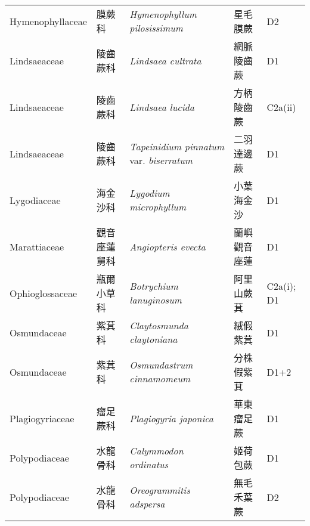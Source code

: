 {\begin{longtable}{p{2.5cm}p{2.5cm}p{4.5cm}p{2.5cm}p{3cm}}
    Hymenophyllaceae & 膜蕨科 & \textit{Hymenophyllum pilosissimum}  & 星毛膜蕨 & D2 \index{Hymenophyllum@\textit{Hymenophyllum}!pilosissimum@\textit{pilosissimum}}  \index{星毛膜蕨} \\
    Lindsaeaceae & 陵齒蕨科 & \textit{Lindsaea cultrata}  & 網脈陵齒蕨 & D1 \index{Lindsaea@\textit{Lindsaea}!cultrata@\textit{cultrata}}  \index{網脈陵齒蕨} \\
    Lindsaeaceae & 陵齒蕨科 & \textit{Lindsaea lucida}  & 方柄陵齒蕨 & C2a(ii) \index{Lindsaea@\textit{Lindsaea}!lucida@\textit{lucida}}  \index{方柄陵齒蕨} \\
    Lindsaeaceae & 陵齒蕨科 & \textit{Tapeinidium pinnatum} var. \textit{biserratum}  & 二羽達邊蕨 & D1 \index{Tapeinidium@\textit{Tapeinidium}!pinnatum@\textit{pinnatum}!var. biserratum@var. \textit{biserratum}}  \index{二羽達邊蕨} \\
    Lygodiaceae & 海金沙科 & \textit{Lygodium microphyllum}  & 小葉海金沙 & D1 \index{Lygodium@\textit{Lygodium}!microphyllum@\textit{microphyllum}}  \index{小葉海金沙} \\
    Marattiaceae & 觀音座蓮舅科 & \textit{Angiopteris evecta}  & 蘭嶼觀音座蓮 & D1 \index{Angiopteris@\textit{Angiopteris}!evecta@\textit{evecta}}  \index{蘭嶼觀音座蓮} \\
    Ophioglossaceae & 瓶爾小草科 & \textit{Botrychium lanuginosum}  & 阿里山蕨萁 & C2a(i); D1 \index{Botrychium@\textit{Botrychium}!lanuginosum@\textit{lanuginosum}}  \index{阿里山蕨萁} \\
    Osmundaceae & 紫萁科 & \textit{Claytosmunda claytoniana}  & 絨假紫萁 & D1 \index{Claytosmunda@\textit{Claytosmunda}!claytoniana@\textit{claytoniana}}  \index{絨假紫萁} \\
    Osmundaceae & 紫萁科 & \textit{Osmundastrum cinnamomeum}  & 分株假紫萁 & D1+2 \index{Osmundastrum@\textit{Osmundastrum}!cinnamomeum@\textit{cinnamomeum}}  \index{分株假紫萁} \\
    Plagiogyriaceae & 瘤足蕨科 & \textit{Plagiogyria japonica}  & 華東瘤足蕨 & D1 \index{Plagiogyria@\textit{Plagiogyria}!japonica@\textit{japonica}}  \index{華東瘤足蕨} \\
    Polypodiaceae & 水龍骨科 & \textit{Calymmodon ordinatus}  & 姬荷包蕨 & D1 \index{Calymmodon@\textit{Calymmodon}!ordinatus@\textit{ordinatus}}  \index{姬荷包蕨} \\
    Polypodiaceae & 水龍骨科 & \textit{Oreogrammitis adspersa}  & 無毛禾葉蕨 & D2 \index{Oreogrammitis@\textit{Oreogrammitis}!adspersa@\textit{adspersa}}  \index{無毛禾葉蕨} \\

\end{longtable}}
